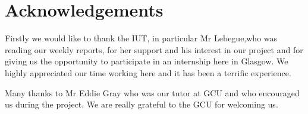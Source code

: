 \chapter{Acknowledgements}

{\large


Firstly we would like to thank the IUT, in particular Mr Lebegue,who was reading our weekly reports, for her support and his interest in our project and for giving us the opportunity to participate in an internship here in Glasgow. We highly appreciated our time working here and it has been a terrific experience.\newline

Many thanks to Mr Eddie Gray who was our tutor at GCU and who encouraged us during the project. We are really grateful to the GCU for welcoming us.\newline

}


\newpage